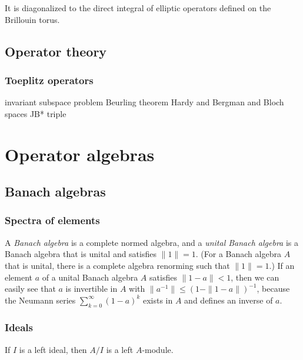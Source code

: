 \documentclass{../../large}
\begin{document}
\begin{prb}
It is diagonalized to the direct integral of elliptic operators defined on the Brillouin torus.
\end{prb}
\begin{pf}
\end{pf}





\chapter{Operator theory}
\section{Toeplitz operators}

invariant subspace problem
Beurling theorem
Hardy and Bergman and Bloch spaces
JB* triple





\part{Operator algebras}
\chapter{Banach algebras}

\section{Spectra of elements}

A \emph{Banach algebra} is a complete normed algebra, and a \emph{unital Banach algebra} is a Banach algebra that is unital and satisfies $\|1\|=1$.
(For a Banach algebra $A$ that is unital, there is a complete algebra renorming such that $\|1\|=1$.)
If an element $a$ of a unital Banach algebra $A$ satisfies $\|1-a\|<1$, then we can easily see that $a$ is invertible in $A$ with $\|a^{-1}\|\le(1-\|1-a\|)^{-1}$, because the Neumann series $\sum_{k=0}^\infty(1-a)^k$ exists in $A$ and defines an inverse of $a$.




\section{Ideals}
\begin{prb}[Ideals]
\begin{parts}
\item If $I$ is a left ideal, then $A/I$ is a left $A$-module.
\end{parts}
\end{prb}
\end{document}

